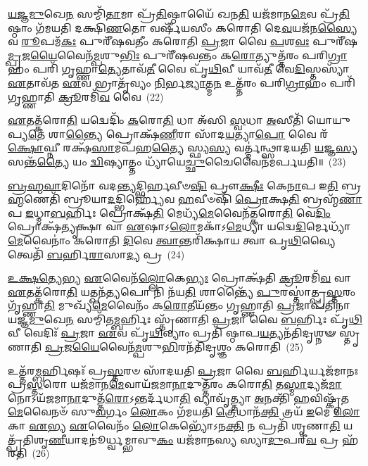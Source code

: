 \-\ul{𑌯}\-\-\ul{𑌜𑍍𑌞}\-\-\ul{𑌮𑍁}\-𑌖𑍇\-\ul{𑌨} 𑌸𑌮𑍍𑌮𑌿᳴\-\ul{𑌤𑌾}\-𑌮𑌾 𑌪𑍍𑌰᳴\-\ul{𑌤𑌿}\-𑌷𑍍𑌠𑌾𑌯𑍈᳴ 𑌖𑌨\-\ul{𑌤𑌿} 𑌯𑌜᳴𑌮𑌾𑌨\-\ul{𑌮𑍇}\-𑌵 𑌪𑍍𑌰᳴\-\ul{𑌤𑌿}\-𑌷𑍍𑌠𑌾𑌂 𑌗᳴𑌮𑌯𑌤𑌿 𑌦𑌕𑍍𑌷𑌿\-\ul{𑌣}\-𑌤𑍋 𑌵𑌰𑍍\mbox{}𑌷𑍀᳴𑌯𑌸𑍀𑌂 𑌕𑌰𑍋𑌤𑌿 𑌦𑍇\-\ul{𑌵}\-𑌯𑌜᳴𑌨\-\ul{𑌸𑍍𑌯𑍈}\-𑌵 \ul{𑌰𑍂}\-𑌪𑌮᳴\-\ul{𑌕𑌃} 𑌪𑍁𑌰𑍀᳴𑌷𑌵𑌤𑍀𑌂 𑌕𑌰𑍋𑌤𑌿 \ul{𑌪𑍍𑌰}\-𑌜𑌾 𑌵𑍈 \ul{𑌪}\-𑌶\-\ul{𑌵𑌃} 𑌪𑍁𑌰𑍀᳴𑌷\-\ul{𑌮𑍍𑌪𑍍𑌰}\-𑌜\-\ul{𑌯𑍈}\-𑌵𑍈𑌨᳴\-\ul{𑌮𑍍𑌪}\-𑌶𑍁\-\ul{𑌭𑌿𑌃} 𑌪𑍁𑌰𑍀᳴𑌷𑌵𑌨𑍍𑌤𑌂 𑌕\-\ul{𑌰𑍋}\-𑌤𑍍𑌯𑍁𑌤𑍍𑌤᳴𑌰𑌂 𑌪𑌰𑌿\-\ul{𑌗𑍍𑌰𑌾}\-𑌹𑌂 𑌪𑌰𑌿᳴ 𑌗𑍃𑌹𑍍𑌣𑌾\-\ul{𑌤𑍍𑌯𑍇}\-𑌤𑌾𑌵᳴\-\ul{𑌤𑍀} 𑌵𑍈 𑌪𑍃᳴\-\ul{𑌥𑌿}\-𑌵𑍀 𑌯𑌾𑌵᳴\-\ul{𑌤𑍀} 𑌵𑍇\-\ul{𑌦𑌿}\-𑌸𑍍𑌤𑌸𑍍𑌯𑌾᳴ \ul{𑌏}\-𑌤𑌾𑌵᳴𑌤 \ul{𑌏}\-𑌵 𑌭𑍍𑌰𑌾𑌤𑍃᳴𑌵𑍍𑌯𑌂 \ul{𑌨𑌿}\-𑌰𑍍𑌭\-\ul{𑌜𑍍𑌯𑌾}\-𑌤𑍍𑌮\-\ul{𑌨} 𑌉𑌤𑍍𑌤᳴𑌰𑌂 𑌪𑌰𑌿\-\ul{𑌗𑍍𑌰𑌾}\-𑌹𑌂 𑌪𑌰𑌿᳴ 𑌗𑍃𑌹𑍍𑌣𑌾𑌤𑌿 \ul{𑌕𑍍𑌰𑍂}\-𑌰𑌮𑌿᳴\-\ul{𑌵} 𑌵𑍈~(22)

\-\ul{𑌏}\-𑌤𑌤𑍍𑌕᳴𑌰𑍋\-\ul{𑌤𑌿} 𑌯𑌦𑍍𑌵𑍇𑌦𑌿𑌂᳴ \ul{𑌕}\-𑌰𑍋\-\ul{𑌤𑌿} 𑌧𑌾 𑌅᳴𑌸𑌿 \ul{𑌸𑍍𑌵}\-𑌧𑌾 \ul{𑌅}\-𑌸𑍀𑌤𑌿᳴ 𑌯𑍋𑌯𑍁𑌪𑍍𑌯\-\ul{𑌤𑍇} 𑌶𑌾\-\ul{𑌨𑍍𑌤𑍍𑌯𑍈} 𑌪𑍍𑌰𑍋𑌕𑍍𑌷᳴\-\ul{𑌣𑍀}\-𑌰𑌾 𑌸𑌾᳴𑌦\-\ul{𑌯}\-𑌤𑍍𑌯𑌾\-\ul{𑌪𑍋} 𑌵𑍈 𑌰᳴\-\ul{𑌕𑍍𑌷𑍋}\-𑌘𑍍𑌨𑍀 𑌰𑌕𑍍𑌷᳴\-\ul{𑌸𑌾}\-𑌮𑌪᳴𑌹\-\ul{𑌤𑍍𑌯𑍈} 𑌸𑍍𑌫𑍍𑌯\-\ul{𑌸𑍍𑌯} 𑌵𑌰𑍍𑌤𑍍𑌮॑𑌨𑍍𑌥𑍍𑌸𑌾𑌦𑌯𑌤𑌿 \ul{𑌯}\-𑌜𑍍𑌞\-\ul{𑌸𑍍𑌯} 𑌸𑌨𑍍𑌤᳴\-\ul{𑌤𑍍𑌯𑍈} 𑌯𑌂 \ul{𑌦𑍍𑌵𑌿}\-𑌷𑍍𑌯𑌾𑌤𑍍𑌤𑌂 𑌧𑍍𑌯𑌾᳴𑌯𑍇\-\ul{𑌚𑍍𑌛𑍁}\-𑌚𑍈𑌵𑍈𑌨᳴𑌮𑌰𑍍𑌪𑌯𑌤𑌿॥~(23)

{\anuvakamend[{\-\ul{𑌭}\-\-\ul{𑌜}\-\-\ul{𑌤𑌿} \ul{𑌪𑍍𑌰}\-𑌜𑌾𑌪᳴𑌤𑌿𑌨𑍇\-\ul{𑌵} 𑌵𑍈 𑌤𑍍𑌰𑌯᳴𑌸𑍍𑌤𑍍𑌰𑌿𑍞𑌶𑌚𑍍𑌚}]}%

\-\ul{𑌬𑍍𑌰}\-\-\ul{𑌹𑍍𑌮}\-\-\ul{𑌵𑌾}\-𑌦𑌿𑌨𑍋᳴ 𑌵𑌦\-\ul{𑌨𑍍𑌤𑍍𑌯}\-𑌦𑍍𑌭𑌿𑌰𑍍\mbox{}\-\ul{𑌹}\-𑌵𑍀𑍞\-\ul{𑌷𑌿} 𑌪𑍍𑌰𑍗\-\ul{𑌕𑍍𑌷𑍀𑌃} 𑌕𑍇\-\ul{𑌨𑌾}\-𑌪 𑌇\-\ul{𑌤𑌿} 𑌬𑍍𑌰\-\ul{𑌹𑍍𑌮}\-𑌣𑍇𑌤𑌿᳴ 𑌬𑍍𑌰𑍂𑌯𑌾\-\ul{𑌦}\-𑌦𑍍𑌭𑌿𑌰𑍍\mbox{}𑌹𑍍𑌯𑍇᳴𑌵 \ul{𑌹}\-𑌵𑍀𑍞𑌷𑌿᳴ \ul{𑌪𑍍𑌰𑍋}\-𑌕𑍍𑌷\-\ul{𑌤𑌿} 𑌬𑍍𑌰𑌹𑍍𑌮᳴\-\ul{𑌣𑌾}\-𑌪 \ul{𑌇}\-𑌧𑍍𑌮𑌾\-\ul{𑌬}\-𑌰𑍍\mbox{}𑌹𑌿𑌃 𑌪𑍍𑌰𑍋𑌕𑍍𑌷᳴\-\ul{𑌤𑌿} 𑌮𑍇𑌧𑍍𑌯᳴\-\ul{𑌮𑍇}\-𑌵𑍈𑌨᳴𑌤𑍍𑌕𑌰𑍋\-\ul{𑌤𑌿} 𑌵𑍇\-\ul{𑌦𑌿𑌂} 𑌪𑍍𑌰𑍋𑌕𑍍𑌷᳴\-\ul{𑌤𑍍𑌯𑍃}\-𑌕𑍍𑌷𑌾 𑌵𑌾 \ul{𑌏}\-𑌷𑌾\-𑌽\-\ul{𑌲𑍋}\-𑌮𑌕𑌾᳴\-𑌽\-\ul{𑌮𑍇}\-𑌧𑍍𑌯𑌾 𑌯𑌦𑍍𑌵𑍇\-\ul{𑌦𑌿}\-𑌰𑍍𑌮𑍇𑌧𑍍𑌯𑌾᳴\-\ul{𑌮𑍇}\-𑌵𑍈𑌨𑌾𑌂॑ 𑌕𑌰𑍋𑌤𑌿 \ul{𑌦𑌿}\-𑌵𑍇 \ul{𑌤𑍍𑌵𑌾}\-𑌨𑍍𑌤𑌰𑌿᳴𑌕𑍍𑌷𑌾𑌯 𑌤𑍍𑌵𑌾 𑌪𑍃\-\ul{𑌥𑌿}\-𑌵𑍍𑌯𑍈 𑌤𑍍𑌵𑍇𑌤𑌿᳴ \ul{𑌬}\-𑌰𑍍\mbox{}𑌹𑌿\-\ul{𑌰𑌾}\-𑌸𑌾\-\ul{𑌦𑍍𑌯} 𑌪𑍍𑌰~(24)

\-\ul{𑌉}\-\-\ul{𑌕𑍍𑌷}\-\-\ul{𑌤𑍍𑌯𑍇}\-𑌭𑍍𑌯 \ul{𑌏}\-𑌵𑍈𑌨᳴\-\ul{𑌲𑍍𑌲𑍋}\-𑌕𑍇\-\ul{𑌭𑍍𑌯𑌃} 𑌪𑍍𑌰𑍋𑌕𑍍𑌷᳴𑌤𑌿 \ul{𑌕𑍍𑌰𑍂}\-𑌰𑌮𑌿᳴\-\ul{𑌵} 𑌵𑌾 \ul{𑌏}\-𑌤𑌤𑍍𑌕᳴𑌰𑍋\-\ul{𑌤𑌿} 𑌯𑌤𑍍𑌖𑌨᳴\-\ul{𑌤𑍍𑌯}\-𑌪𑍋 𑌨𑌿 𑌨᳴𑌯\-\ul{𑌤𑌿} 𑌶𑌾𑌨𑍍𑌤𑍍𑌯𑍈᳴ \ul{𑌪𑍁}\-𑌰𑌸𑍍𑌤𑌾॑𑌤𑍍𑌪𑍍𑌰\-\ul{𑌸𑍍𑌤}\-𑌰𑌂 𑌗𑍃᳴𑌹𑍍𑌣𑌾\-\ul{𑌤𑌿} 𑌮𑍁𑌖𑍍𑌯᳴\-\ul{𑌮𑍇}\-𑌵𑍈𑌨𑌂᳴ 𑌕\-\ul{𑌰𑍋}\-𑌤𑍀𑌯᳴𑌨𑍍𑌤𑌂 𑌗𑍃𑌹𑍍𑌣𑌾𑌤𑌿 \ul{𑌪𑍍𑌰}\-𑌜𑌾𑌪᳴𑌤𑌿𑌨𑌾 𑌯𑌜𑍍𑌞\-\ul{𑌮𑍁}\-𑌖𑍇\-\ul{𑌨} 𑌸𑌮𑍍𑌮𑌿᳴𑌤\-\ul{𑌮𑍍𑌬}\-𑌰𑍍\mbox{}𑌹𑌿𑌃 𑌸𑍍𑌤𑍃᳴𑌣𑌾𑌤𑌿 \ul{𑌪𑍍𑌰}\-𑌜𑌾 𑌵𑍈 \ul{𑌬}\-𑌰𑍍\mbox{}𑌹𑌿𑌃 𑌪𑍃᳴\-\ul{𑌥𑌿}\-𑌵𑍀 𑌵𑍇𑌦𑌿𑌃᳴ \ul{𑌪𑍍𑌰}\-𑌜𑌾 \ul{𑌏}\-𑌵 𑌪𑍃᳴\-\ul{𑌥𑌿}\-𑌵𑍍𑌯𑌾𑌂 𑌪𑍍𑌰𑌤𑌿᳴ 𑌷𑍍𑌠𑌾𑌪\-\ul{𑌯}\-𑌤𑍍𑌯𑌨᳴𑌤𑌿𑌦𑍃𑌶𑍍𑌨𑍟 𑌸𑍍𑌤𑍃𑌣𑌾𑌤𑌿 \ul{𑌪𑍍𑌰}\-𑌜\-\ul{𑌯𑍈}\-𑌵𑍈𑌨᳴\-\ul{𑌮𑍍𑌪}\-𑌶𑍁\-\ul{𑌭𑌿}\-𑌰𑌨᳴𑌤𑌿𑌦𑍃𑌶𑍍𑌞𑌂 𑌕𑌰𑍋𑌤𑌿~(25)

𑌉𑌤𑍍𑌤᳴𑌰\-\ul{𑌮𑍍𑌬}\-𑌰𑍍\mbox{}𑌹𑌿𑌷𑌃᳴ 𑌪𑍍𑌰\-\ul{𑌸𑍍𑌤}\-𑌰𑍞 𑌸𑌾᳴𑌦𑌯𑌤𑌿 \ul{𑌪𑍍𑌰}\-𑌜𑌾 𑌵𑍈 \ul{𑌬}\-𑌰𑍍\mbox{}𑌹𑌿𑌰𑍍𑌯𑌜᳴𑌮𑌾𑌨𑌃 𑌪𑍍𑌰\-\ul{𑌸𑍍𑌤}\-𑌰𑍋 𑌯𑌜᳴𑌮𑌾𑌨\-\ul{𑌮𑍇}\-𑌵𑌾𑌯᳴𑌜𑌮𑌾\-\ul{𑌨𑌾}\-𑌦𑍁𑌤𑍍𑌤᳴𑌰𑌂 𑌕𑌰𑍋\-\ul{𑌤𑌿} 𑌤\-\ul{𑌸𑍍𑌮𑌾}\-𑌦𑍍𑌯𑌜᳴\-\ul{𑌮𑌾}\-𑌨𑍋\-𑌽𑌯᳴𑌜𑌮𑌾\-\ul{𑌨𑌾}\-𑌦𑍁𑌤𑍍𑌤᳴\-\ul{𑌰𑍋}\-\-𑌽𑌨𑍍𑌤𑌰𑍍𑌦᳴𑌧𑌾\-\ul{𑌤𑌿} 𑌵𑍍𑌯𑌾𑌵𑍃᳴𑌤𑍍𑌤𑍍𑌯𑌾 \ul{𑌅}\-𑌨𑌕𑍍𑌤𑌿᳴ \ul{𑌹}\-𑌵𑌿𑌷𑍍𑌕𑍃᳴𑌤\-\ul{𑌮𑍇}\-𑌵𑍈𑌨𑍞᳴ 𑌸𑍁\-\ul{𑌵}\-𑌰𑍍𑌗𑌂 \ul{𑌲𑍋}\-𑌕𑌂 𑌗᳴𑌮𑌯𑌤𑌿 \ul{𑌤𑍍𑌰𑍇}\-𑌧𑌾𑌨᳴\-\ul{𑌕𑍍𑌤𑌿} 𑌤𑍍𑌰𑌯᳴ \ul{𑌇}\-𑌮𑍇 \ul{𑌲𑍋}\-𑌕𑌾 \ul{𑌏}\-𑌭𑍍𑌯 \ul{𑌏}\-𑌵𑍈𑌨𑌂᳴ \ul{𑌲𑍋}\-𑌕𑍇𑌭𑍍𑌯𑍋᳴\-𑌽𑌨\-\ul{𑌕𑍍𑌤𑌿} 𑌨 𑌪𑍍𑌰𑌤𑌿᳴ 𑌶𑍃𑌣𑌾\-\ul{𑌤𑌿} 𑌯𑌤𑍍𑌪𑍍𑌰᳴𑌤𑌿𑌶𑍃\-\ul{𑌣𑍀}\-𑌯𑌾𑌦𑌨𑍂॑𑌰𑍍𑌧𑍍𑌵𑌮𑍍𑌭𑌾𑌵𑍁\-\ul{𑌕𑌂} 𑌯𑌜᳴𑌮𑌾𑌨𑌸𑍍𑌯 𑌸𑍍𑌯𑌾\-\ul{𑌦𑍁}\-𑌪𑌰𑍀᳴\-\ul{𑌵} 𑌪𑍍𑌰 𑌹᳴𑌰𑌤𑌿~(26)

